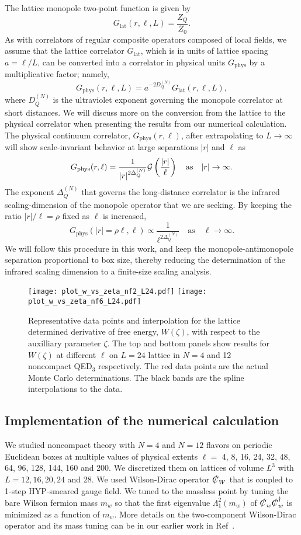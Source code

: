\documentclass[prd, onecolumn, superscriptaddress, nofootinbib, notitlepage, floatfix]{revtex4-1}
\newcommand\bef{\begin{figure*}}
\newcommand\eef[1]{\label{fg:#1}\end{figure*}}
\newcommand\beq{\begin{equation}}
\newcommand\eeq[1]{\label{#1}\end{equation}}
\newcommand{\lat}{\mathrm{lat}}
\newcommand{\phys}{\mathrm{phys}}
\begin{document}
The lattice monopole two-point function is given by 
\beq
G_\lat(r,\ell,L) = \frac{Z_Q}{Z_0}.
\eeq{baretwopoint}
As with correlators of regular composite operators composed of local
fields, we assume that the lattice correlator $G_\lat$, which is
in units of lattice spacing $a=\ell/L$, can be converted into a
correlator in physical units $G_\phys$ by a multiplicative factor;
namely,
\beq
G_\phys(r,\ell,L) = a^{-2D_Q^{(N)}} G_\lat(r,\ell,L),
\eeq{renormalization}
where $D_Q^{(N)}$ is the ultraviolet exponent governing the monopole
correlator at short distances.  We will discuss more on the conversion
from the lattice to the physical correlator when presenting the
results from our numerical calculation.  The physical continuum
correlator, $G_\phys(r,\ell)$, after extrapolating to $L\to\infty$ will
show scale-invariant behavior at large separations $|r|$ and $\ell$
as
\beq
G_\phys(r,\ell) = \frac{1}{|r|^{2\Delta^{(N)}_Q}} {\cal G}\left(\frac{|r|}{\ell}\right)\quad\text{as}\quad |r|\to\infty.
\eeq{scaleinvcorr}
The exponent $\Delta^{(N)}_Q$ that governs the long-distance
correlator is the infrared scaling-dimension of the monopole operator
that we are seeking.  By keeping the ratio $|r|/\ell = \rho$ fixed
as $\ell$ is increased,
\beq
G_\phys(|r|=\rho\ell,\ell) \propto \frac{1}{\ell^{2\Delta^{(N)}_Q}}\quad\text{as}\quad \ell\to\infty.
\eeq{scaleinvcorr2}
We will follow this procedure in this work, and keep the monopole-antimonopole
separation proportional to box size, thereby reducing the
determination of the infrared scaling dimension to a finite-size
scaling analysis.

\bef
\centering
\texttt{[image: plot\_w\_vs\_zeta\_nf2\_L24.pdf]}
\texttt{[image: plot\_w\_vs\_zeta\_nf6\_L24.pdf]}
\caption{Representative data points and interpolation for the lattice
determined derivative of free energy, $W(\zeta)$, with respect to
the auxilliary parameter $\zeta$. The top and bottom panels show
results for  $W(\zeta)$ at different $\ell$ on $L=24$ lattice in
$N=4$ and 12 noncompact QED$_3$ respectively. The red data points
are the actual Monte Carlo determinations. The black bands are the
spline interpolations to the data. }
\eef{wversusz}

\subsection{Implementation of the numerical calculation}

We studied noncompact theory with $N=4$ and $N=12$ flavors on
periodic Euclidean boxes at multiple values of physical extents
$\ell=$ 4, 8, 16, 24, 32, 48, 64, 96, 128, 144, 160 and 200.  We
discretized them on lattices of volume $L^3$ with $L=12, 16,20,24$
and 28. We used Wilson-Dirac operator $\slashed{C}_W$ that is coupled
to 1-step HYP-smeared gauge field. We tuned to the massless point
by tuning the bare Wilson fermion mass $m_w$ so that the first
eigenvalue $\Lambda_1^2(m_w)$ of $\slashed{C}_w\slashed{C}_w^\dagger$
is minimized as a function of $m_w$. More details on the two-component
Wilson-Dirac operator and its mass tuning can be in our earlier
work in Ref~\cite{Karthik:2015sgq}.
\end{document}
